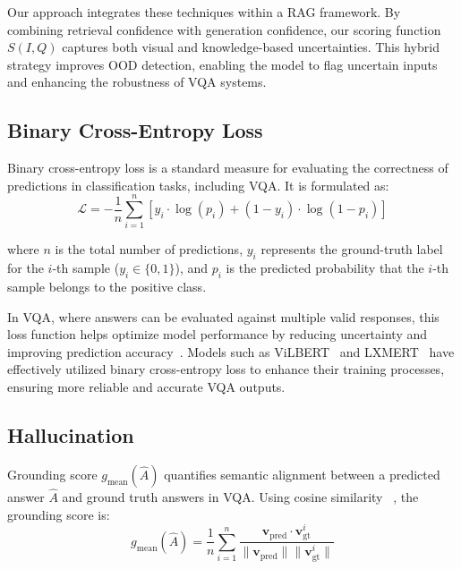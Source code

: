Our approach integrates these techniques within a RAG framework. By combining retrieval confidence with generation confidence, our scoring function $S(I,Q)$ captures both visual and knowledge-based uncertainties. This hybrid strategy improves OOD detection, enabling the model to flag uncertain inputs and enhancing the robustness of VQA systems.

\subsection{Binary Cross-Entropy Loss}
Binary cross-entropy loss is a standard measure for evaluating the correctness of predictions in classification tasks, including VQA. It is formulated as:
\begin{equation}
\mathcal{L} = - \frac{1}{n} \sum_{i=1}^n \left[ y_i \cdot \log(p_i) + (1 - y_i) \cdot \log(1 - p_i) \right]
\end{equation}

where \( n \) is the total number of predictions, \( y_i \) represents the ground-truth label for the \( i \)-th sample (\( y_i \in \{0, 1\} \)), and \( p_i \) is the predicted probability that the \( i \)-th sample belongs to the positive class.

In VQA, where answers can be evaluated against multiple valid responses, this loss function helps optimize model performance by reducing uncertainty and improving prediction accuracy~\cite{antol2015vqa, goyal2017making}. Models such as ViLBERT~\cite{lu2019vilbert} and LXMERT~\cite{tan2019lxmert} have effectively utilized binary cross-entropy loss to enhance their training processes, ensuring more reliable and accurate VQA outputs.

\subsection{Hallucination}
Grounding score \( g_{\text{mean}}(\hat{A}) \) quantifies semantic alignment between a predicted answer \(\hat{A}\) and ground truth answers in VQA. Using cosine similarity~\cite{radford2021learning, jia2021scaling} , the grounding score is:
\begin{equation}
g_{\text{mean}}(\hat{A}) = \frac{1}{n} \sum_{i=1}^n \frac{\mathbf{v}_{\text{pred}} \cdot \mathbf{v}_{\text{gt}}^i}{\|\mathbf{v}_{\text{pred}}\| \|\mathbf{v}_{\text{gt}}^i\|}
\end{equation}

